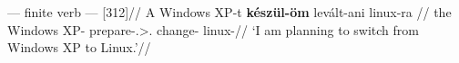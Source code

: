 \ex\label{ex:windows-keszul}%
    \begingl
        \glpreamble \Obj{} --- finite verb --- \Inf{} [312]//
        \gla 	A {Windows XP}-t \textbf{készül-öm} levált-ani linux-ra \nogloss{\dots}//
        \glb 	the {Windows XP}-\Acc{} prepare-\Fsg.\Sbj>\Third.\Obj{} change-\Inf{} linux-\Subl{}//
        \glft 	\enquote*{I am planning to switch from Windows XP to Linux.}//
    \endgl
\xe
%

